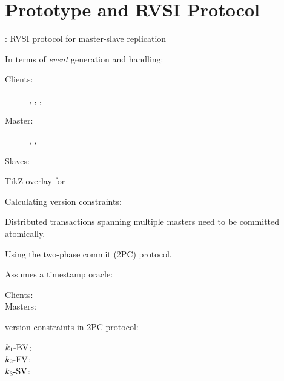 \section{\chameleon{} Prototype and RVSI Protocol}



\begin{frame}{}
  \centerline{\textbf{\rvsims{}}: RVSI protocol for master-slave replication}

  \vspace{1.0cm}
  In terms of \emph{event} generation and handling:
  \begin{description}
    \item[Clients:] \ebegin, \eread, \ewrite, \eend%
    \item[Master:] \estart, \ecommit, \esend%
    \item[Slaves:] \ereceive%
  \end{description}
\end{frame}

\begin{frame}{}
  TikZ overlay for \rvsims{}
\end{frame}

\begin{frame}{}
  Calculating version constraints:
\end{frame}

\begin{frame}{}
  \begin{center}
    Distributed transactions spanning multiple masters need to be committed atomically.

    \pause
    Using the two-phase commit (2PC) protocol.
  \end{center}
\end{frame}

\begin{frame}{}
  Assumes a timestamp oracle:
  \begin{description}
    \item[Clients:] 
    \item[Masters:]
  \end{description}
\end{frame}

\begin{frame}{}
  \rvsi{} version constraints in 2PC protocol:
  \begin{description}
    \item[$k_1\text{-BV}$:]
    \item[$k_2\text{-FV}$:]
    \item[$k_3\text{-SV}$:]
  \end{description}
\end{frame}

